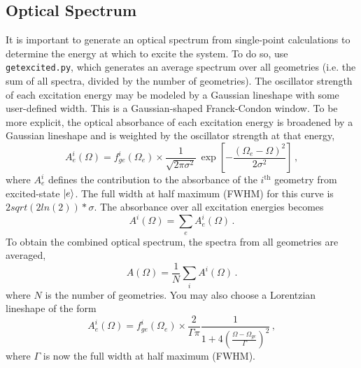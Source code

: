 \documentclass[letterpaper,12pt,titlepage]{article}
\begin{document}
\subsection{Optical Spectrum}
\label{optspec}
It is important to generate an optical spectrum from single-point calculations to determine the energy at which to excite the system.  To do so, use \verb+getexcited.py+, which generates an average spectrum over all geometries (i.e. the sum of all spectra, divided by the number of geometries).  The oscillator strength of each excitation energy may be modeled by a Gaussian lineshape with some user-defined width.  This is a Gaussian-shaped Franck-Condon window.  To be more explicit, the optical absorbance of each excitation energy is broadened by a Gaussian lineshape and is weighted by the oscillator strength at that energy,
\begin{equation}
A_{e}^{i}\left(\Omega\right) = f_{ge}^{i}\left(\Omega_{e}\right)\times\frac{1}{\sqrt{2\pi\sigma^{2}}}\,\exp\left[-\frac{\left(\Omega_{e}-\Omega\right)^{2}}{2\sigma^{2}}\right]\,,
\end{equation}
where $A_{e}^{i}$ defines the contribution to the absorbance of the $i^{\text{th}}$ geometry from excited-state $\ket{e}$. The full width at half maximum (FWHM) for this curve is $2sqrt(2ln(2))*\sigma$. The absorbance over all excitation energies becomes
\begin{equation}
A^{i}\left(\Omega\right) = \sum_{e} A_{e}^{i}\left(\Omega\right)\,.
\end{equation}
To obtain the combined optical spectrum, the spectra from all geometries are averaged,
\begin{equation}
A\left(\Omega\right) = \frac{1}{N}\sum_{i} A^{i}\left(\Omega\right)\,.
\end{equation}
where $N$ is the number of geometries.  You may also choose a Lorentzian lineshape of the form
\begin{equation}
A_{e}^{i}\left(\Omega\right) = f_{ge}^{i}\left(\Omega_{e}\right)\times\frac{2}{\Gamma\pi}\frac{1}{1+4\left(\frac{\Omega-\Omega_{ge}}{\Gamma}\right)^{2}}\,,
\end{equation}
where $\Gamma$ is now the full width at half maximum (FWHM).
\end{document}
